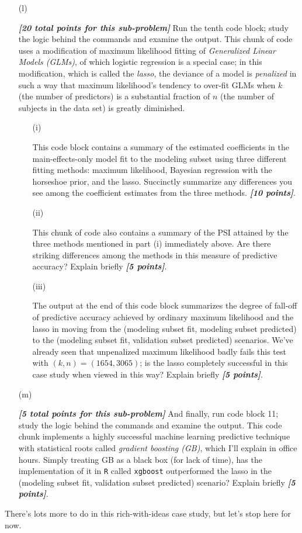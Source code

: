 \documentclass[12pt]{article}
\newcommand{\bi}[1]{\textbf{\textit{#1}}}
\begin{document}
\begin{itemize}
\item[(l)]

\bi{[20 total points for this sub-problem]} Run the tenth code block; study the logic behind the commands and examine the output. This chunk of code uses a modification of maximum likelihood fitting of \textit{Generalized Linear Models (GLMs)}, of which logistic regression is a special case; in this modification, which is called the \textit{lasso}, the deviance of a model is \textit{penalized} in such a way that maximum likelihood's tendency to over-fit GLMs when $k$ (the number of predictors) is a substantial fraction of $n$ (the number of subjects in the data set) is greatly diminished.

\begin{itemize}

\item[(i)]

This code block contains a summary of the estimated coefficients in the main-effects-only model fit to the modeling subset using three different fitting methods: maximum likelihood, Bayesian regression with the horseshoe prior, and the lasso. Succinctly summarize any differences you see among the coefficient estimates from the three methods. \bi{[10 points]}.

\item[(ii)]

This chunk of code also contains a summary of the PSI attained by the three methods mentioned in part (i) immediately above. Are there striking differences among the methods in this measure of predictive accuracy? 
Explain briefly \bi{[5 points]}.

\item[(iii)]

The output at the end of this code block summarizes the degree of fall-off of predictive accuracy achieved by ordinary maximum likelihood and the lasso in moving from the (modeling subset fit, modeling subset predicted) to the (modeling subset fit, validation subset predicted) scenarios. We've already seen that unpenalized maximum likelihood badly fails this test with $( k, n ) = ( 1654, 3065 )$; is the lasso completely successful in this case study when viewed in this way? Explain briefly \bi{[5 points]}.

\end{itemize}

\item[(m)]

\bi{[5 total points for this sub-problem]} And finally, run code block 11; study the logic behind the commands and examine the output. This code chunk implements a highly successful machine learning predictive technique with statistical roots called \textit{gradient boosting (GB)}, which I'll explain in office hours. Simply treating GB as a black box (for lack of time), has the implementation of it in \texttt{R} called \texttt{xgboost} outperformed the lasso in the (modeling subset fit, validation subset predicted) scenario? Explain briefly \bi{[5 points]}.

\end{itemize}

There's lots more to do in this rich-with-ideas case study, but let's stop here for now.
\end{document}
